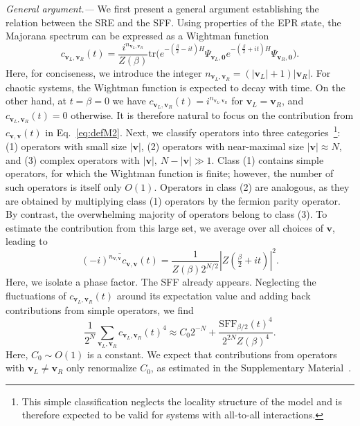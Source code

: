 \documentclass[aps,prl,twocolumn,superscriptaddress,longbibliography]{revtex4-2}
\begin{document}
 \emph{ \color{blue}General argument.---} We first present a general argument establishing the relation between the SRE and the SFF. Using properties of the EPR state, the Majorana spectrum can be expressed as a Wightman function
 \begin{equation}\label{eq:Wightman}
 c_{\bm{v}_L,\bm{v}_R}(t)=\frac{i^{n_{\bm{v}_L,\bm{v}_R}}}{Z(\beta)}\text{tr}\Big(e^{-(\frac{\beta}{2}-it) H}\Psi_{\bm{v}_L,\bm{0}}e^{-(\frac{\beta}{2}+it) H}\Psi_{\bm{v}_R,\bm{0}}\Big).
 \end{equation}
 Here, for conciseness, we introduce the integer $n_{\bm{v}_L,\bm{v}_R}=(|\bm{v}_L|+1)|\bm{v}_R|$. For chaotic systems, the Wightman function is expected to decay with time. On the other hand, at $t=\beta=0$ we have $c_{\bm{v}_L,\bm{v}_R}(t)=i^{n_{\bm{v}_L,\bm{v}_R}}$ for $\bm{v}_L=\bm{v}_R$, and $c_{\bm{v}_L,\bm{v}_R}(t)=0$ otherwise. It is therefore natural to focus on the contribution from $c_{\bm{v},\bm{v}}(t)$ in Eq.~\eqref{eq:defM2}. Next, we classify operators into three categories~\footnote{This simple classification neglects the locality structure of the model and is therefore expected to be valid for systems with all-to-all interactions.}: (1) operators with small size $|\bm{v}|$, (2) operators with near-maximal size $|\bm{v}|\approx N$, and (3) complex operators with $|\bm{v}|,\ N-|\bm{v}|\gg 1$. Class (1) contains simple operators, for which the Wightman function is finite; however, the number of such operators is itself only $O(1)$. Operators in class (2) are analogous, as they are obtained by multiplying class (1) operators by the fermion parity operator. By contrast, the overwhelming majority of operators belong to class (3). To estimate the contribution from this large set, we average over all choices of $\bm{v}$, leading to
\begin{equation}\label{eq:averagedc}
 \overline{(-i)^{n_{\bm{v},\bm{v}}}c_{\bm{v},\bm{v}}(t)}=\frac{1}{Z(\beta)2^{N/2}}\left|Z\left(\tfrac{\beta}{2}+it\right)\right|^2.
 \end{equation}
 Here, we isolate a phase factor. The SFF already appears. Neglecting the fluctuations of $c_{\bm{v}_L,\bm{v}_R}(t)$ around its expectation value and adding back contributions from simple operators, we find
 \begin{equation}\label{eq:sum}
 \frac{1}{2^{N}}\sum_{{\bm{v}_L,\bm{v}_R}}c_{\bm{v}_L,\bm{v}_R}(t)^4\approx C_0 2^{-N}+\frac{\text{SFF}_{{\beta}/{2}}(t)^4}{2^{2N}Z(\beta)^4}.
 \end{equation}
 Here, $C_0\sim O(1)$ is a constant. We expect that contributions from operators with $\bm{v}_L\neq\bm{v}_R$ only renormalize $C_0$, as estimated in the Supplementary Material~\cite{SM}.
\end{document}
